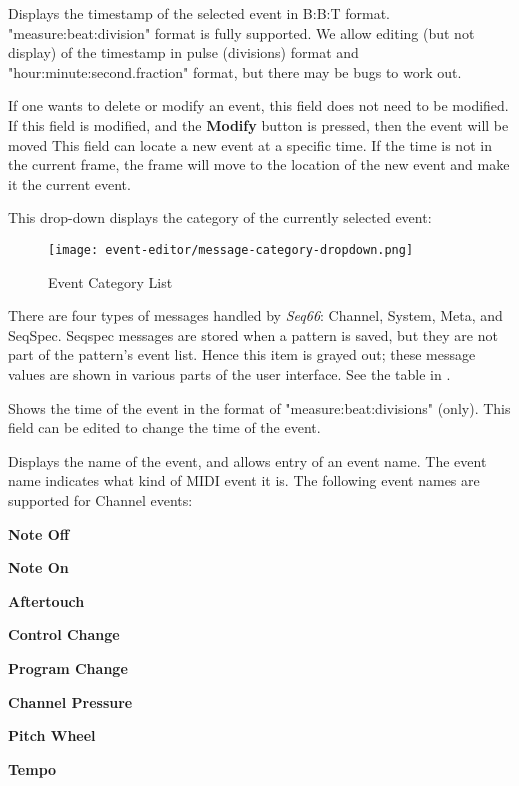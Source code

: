   Displays the timestamp of the selected event in B:B:T format.
   "measure:beat:division" format is fully supported.
   We allow editing (but not display) of the timestamp in
   pulse (divisions) format and "hour:minute:second.fraction" format, but
   there may be bugs to work out.

   If one wants to delete or modify an event, this field does not need to be
   modified. If this field is modified, and the \textbf{Modify}
   button is pressed, then the event will be moved  This field can locate
   a new event at a specific time.  If the time is not in the current frame,
   the frame will move to the location of the new event and make it the current
   event.

   This drop-down displays the category of the currently selected event:

\begin{figure}[H]
   \centering
   \texttt{[image: event-editor/message-category-dropdown.png]}
   \caption{Event Category List}
   \label{fig:event_editor_category_dropdown}
\end{figure}

   There are four types of messages handled by \textsl{Seq66}:
   Channel, System, Meta, and SeqSpec. 
   Seqspec messages are stored when a pattern is saved, but they are
   not part of the pattern's event list.
   Hence this item is grayed out; these message values are shown in various
   parts of the user interface.
   See the table in .

   Shows the time of the event in the format of "measure:beat:divisions" (only).
   This field can be edited to change the time of the event.

   Displays the name of the event, and allows entry of an event name.
   The event name indicates what kind of MIDI event it is. 
   The following event names are supported for Channel events:

   \begin{enumber}
      \item \textbf{Note Off}
      \item \textbf{Note On}
      \item \textbf{Aftertouch}
      \item \textbf{Control Change}
      \item \textbf{Program Change}
      \item \textbf{Channel Pressure}
      \item \textbf{Pitch Wheel}
      \item \textbf{Tempo}
   \end{enumber}

